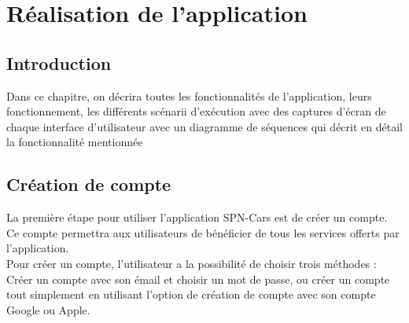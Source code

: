 \chapter{Réalisation de l'application}
\minitoc
\clearpage
\section*{Introduction} Dans ce chapitre, on décrira toutes les fonctionnalités de l'application, leurs fonctionnement, les différents scénarii d'exécution avec des captures d'écran de chaque interface d'utilisateur avec un diagramme de séquences qui décrit en détail la fonctionnalité mentionnée
\justifying
\section{Création de compte}
La première étape pour utiliser l'application SPN-Cars est de créer un compte. Ce compte permettra aux utilisateurs de bénéficier de tous les services offerts par l'application.\\
\noindent Pour créer un compte, l'utilisateur a la possibilité de choisir trois méthodes : Créer un compte avec son émail et choisir un mot de passe, ou créer un compte tout simplement en utilisant l'option de création de compte avec son compte Google ou Apple.
